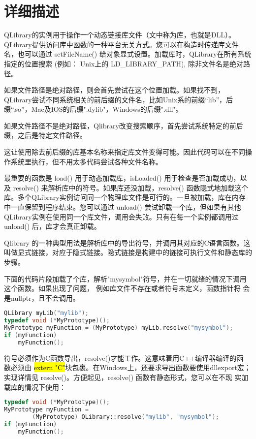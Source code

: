 \section{详细描述}

QLibrary的实例用于操作一个动态链接库文件（文中称为库，也就是DLL）。QLibrary提供访问库中函数的一种平台无关方式。您可以在构造时传递库文件名，也可以通过 setFileName() 给对象显式设置。加载库时，QLibrary在所有系统指定的位置搜索 (例如： Unix上的 LD\_LIBRARY\_PATH), 除非文件名是绝对路径。

如果文件路径是绝对路径，则会首先尝试在这个位置加载。如果找不到，QLibrary尝试不同系统相关的前后缀的文件名，比如Unix系的前缀“lib”，后缀“.so”，Mac及IOS的后缀".dylib"，Windows的后缀".dll"。

如果文件路径不是绝对路径，Qlibrary改变搜索顺序，首先尝试系统特定的前后缀，之后是特定文件路径。

这让使用除去前后缀的库基本名称来指定库文件变得可能。因此代码可以在不同操作系统里执行，但不用太多代码尝试各种文件名称。

最重要的函数是 load() 用于动态加载库，isLoaded() 用于检查是否加载成功，以及 resolve() 来解析库中的符号。如果库还没加载，resolve() 函数隐式地加载这个库。多个QLibrary实例访问同一个物理库文件是可行的。一旦被加载，库在内存中一直保留到程序结束。您可以通过 unload() 尝试卸载一个库，但如果有其他QLibrary实例在使用同一个库文件，调用会失败。只有在每一个实例都调用过 unload() 后，库才会真正卸载。

Qlibrary 的一种典型用法是解析库中的导出符号，并调用其对应的C语言函数。这叫做显式链接，对应于隐式链接。隐式链接是构建中的链接可执行文件和静态库的步骤。

下面的代码片段加载了个库，解析"mysymbol"符号，并在一切就绪的情况下调用
这个函数。如果出现了问题， 例如库文件不存在或者符号未定义，函数指针将
会是nullptr，且不会调用。

\begin{lstlisting}[language=C++]
QLibrary myLib("mylib");
typedef void (*MyPrototype)();
MyPrototype myFunction = (MyPrototype) myLib.resolve("mysymbol");
if (myFunction)
    myFunction();
\end{lstlisting}

符号必须作为C函数导出，resolve()才能工作。这意味着用C++编译器编译的函
数必须由 \hl{extern "C"}块包裹。在Windows上，还要求导出函数要使用dllexport宏；
实现详情见 resolve()。方便起见，resolve() 函数有静态形式，您可以在不现
实加载库的情况下使用：


\begin{lstlisting}[language=C++]
typedef void (*MyPrototype)();
MyPrototype myFunction =
        (MyPrototype) QLibrary::resolve("mylib", "mysymbol");
if (myFunction)
    myFunction();
\end{lstlisting}

